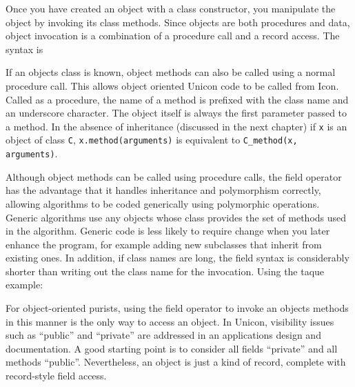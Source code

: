 Once you have created an object with a class constructor, you manipulate
the object by invoking its class methods. Since objects are
both procedures and data, object invocation is a combination of a procedure call and a record
access. The syntax is


If an object{\textquotesingle}s class is known, object methods can also
be called using a normal procedure call. This allows object oriented
Unicon code to be called from Icon. Called as a procedure, the name of
a method is prefixed with the class name and an underscore character.
The object itself is always the first parameter passed to a method. In
the absence of inheritance (discussed in the next chapter) if
\texttt{x} is an object of class \texttt{C},
\texttt{x.method(arguments)} is equivalent to \texttt{C\_method(x,
arguments)}.

Although object methods can be called using procedure calls, the field
operator has the advantage that it handles inheritance and polymorphism
correctly, allowing algorithms to be coded generically using
polymorphic operations. Generic algorithms use any objects whose class
provides the set of methods used in the algorithm. Generic code is less
likely to require change when you later enhance the program, for
example adding new subclasses that inherit from
existing ones. In addition, if class names are long, the field syntax
is considerably shorter than writing out the class name for the
invocation. Using the taque example: 


For object-oriented purists, using the field operator to invoke an
object{\textquotesingle}s methods in this manner is the only way to
access an object. In Unicon, visibility issues such as
``public'' and ``private'' are addressed in an
application{\textquotesingle}s design and documentation. A good
starting point is to consider all fields
``private'' and all methods ``public''. Nevertheless, an object is just a
kind of record, complete with record-style field access.

